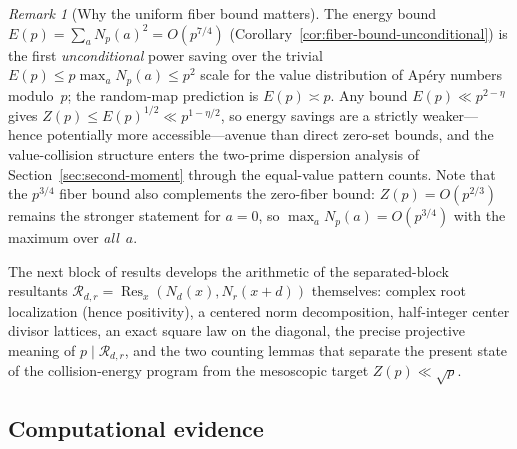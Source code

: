 \documentclass[11pt]{article}
\theoremstyle{definition}
\theoremstyle{remark}
\newtheorem{remark}[theorem]{Remark}
\begin{document}
\begin{remark}[Why the uniform fiber bound matters]
\label{rem:fiber-motivation}
The energy bound
$E(p) = \sum_a N_p(a)^2 = O(p^{7/4})$
(Corollary~\ref{cor:fiber-bound-unconditional})
is the first \emph{unconditional} power saving over the
trivial $E(p) \le p \max_a N_p(a) \le p^2$ scale for the
value distribution of Ap\'ery numbers modulo~$p$; the
random-map prediction is $E(p) \asymp p$.
Any bound $E(p) \ll p^{2-\eta}$ gives
$Z(p) \le E(p)^{1/2} \ll p^{1-\eta/2}$, so energy
savings are a strictly weaker---hence potentially more
accessible---avenue than direct zero-set bounds, and the
value-collision structure enters the two-prime
dispersion analysis of
Section~\ref{sec:second-moment} through the
equal-value pattern counts.
Note that the $p^{3/4}$ fiber bound also complements the
zero-fiber bound: $Z(p) = O(p^{2/3})$ remains the
stronger statement for $a = 0$, so
$\max_a N_p(a) = O(p^{3/4})$ with the maximum over
\emph{all}~$a$.
\end{remark}

The next block of results develops the arithmetic of the
separated-block resultants
$\mathcal R_{d,r} = \operatorname{Res}_x(N_d(x),
N_r(x+d))$ themselves: complex root localization
(hence positivity), a centered norm decomposition,
half-integer center divisor lattices, an exact
square law on the diagonal, the precise projective
meaning of $p \mid \mathcal R_{d,r}$, and the two
counting lemmas that separate the present state of
the collision-energy program from the mesoscopic
target $Z(p) \ll \sqrt p$.





\subsection{Computational evidence}
\end{document}
